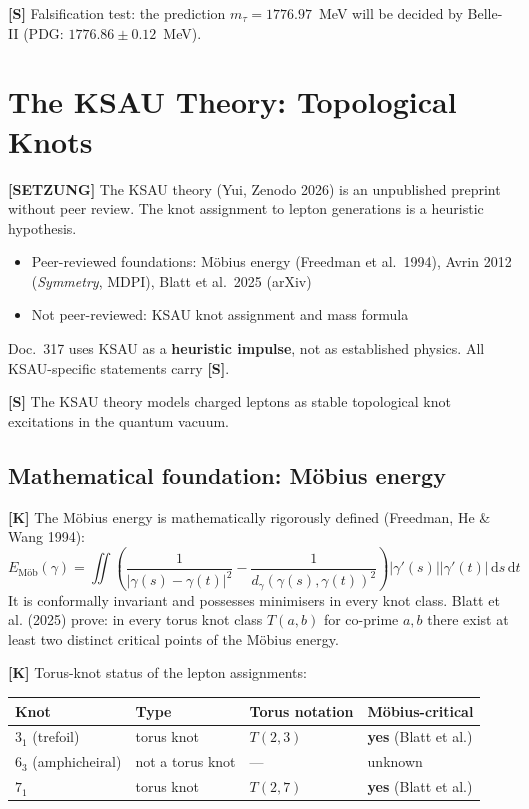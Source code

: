 \textbf{[S]} Falsification test: the prediction $m_\tau = 1776.97$~MeV
will be decided by Belle-II (PDG: $1776.86 \pm 0.12$~MeV).

\section{The KSAU Theory: Topological Knots}

\begin{tcolorbox}[colback=orange!8!white,colframe=orange!60!black,
  title=Scientific status of the KSAU theory]
\textbf{[SETZUNG]} The KSAU theory (Yui, Zenodo 2026) is an
unpublished preprint without peer review. The knot assignment to
lepton generations is a heuristic hypothesis.
\begin{itemize}
  \item Peer-reviewed foundations: Möbius energy (Freedman et al.\ 1994),
    Avrin 2012 (\emph{Symmetry}, MDPI), Blatt et al.\ 2025 (arXiv)
  \item Not peer-reviewed: KSAU knot assignment and mass formula
\end{itemize}
Doc.~317 uses KSAU as a \textbf{heuristic impulse}, not as
established physics. All KSAU-specific statements carry \textbf{[S]}.
\end{tcolorbox}

\textbf{[S]} The KSAU theory models charged leptons as stable
topological knot excitations in the quantum vacuum.

\subsection{Mathematical foundation: Möbius energy}

\textbf{[K]} The Möbius energy is mathematically rigorously defined
(Freedman, He \& Wang 1994):
\begin{equation}
  E_{\text{Möb}}(\gamma) = \iint
  \left(\frac{1}{|\gamma(s)-\gamma(t)|^2}
  - \frac{1}{d_\gamma(\gamma(s),\gamma(t))^2}\right)
  |\gamma'(s)||\gamma'(t)|\,\mathrm{d}s\,\mathrm{d}t
\end{equation}
It is conformally invariant and possesses minimisers in every knot
class. Blatt et al. (2025) prove: in every torus knot class $T(a,b)$
for co-prime $a,b$ there exist at least two distinct critical points
of the Möbius energy.

\textbf{[K]} Torus-knot status of the lepton assignments:

\begin{center}
\begin{tabular}{llll}
\toprule
Knot & Type & Torus notation & Möbius-critical \\
\midrule
$3_1$ (trefoil)   & torus knot   & $T(2,3)$ & \textbf{yes} (Blatt et al.) \\
$6_3$ (amphicheiral) & not a torus knot & --- & unknown \\
$7_1$             & torus knot   & $T(2,7)$ & \textbf{yes} (Blatt et al.) \\
\bottomrule
\end{tabular}
\end{center}

